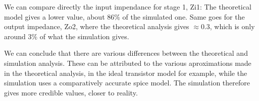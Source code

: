 We can compare directly the input impendance for stage 1, Zi1: The theoretical model gives a lower value, about $86\%$ of the simulated one. Same goes for the output impedance, Zo2, where the theoretical analysis gives $\approx 0.3$, which is only around $3\%$ of what the simulation gives.

\par
We can conclude that there are various differences between the theoretical and simulation analysis. These can be attributed to the various aproximations
made in the theoretical analysis, in the ideal transistor model for example, while the simulation uses a comparatively accurate spice model. The simulation therefore gives more credible values, closer to reality.